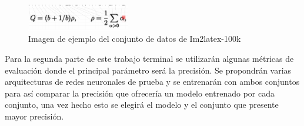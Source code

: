 \begin{figure}[h]
	\centering
	\includegraphics[width=0.4\textwidth]{capitulo5/dataset/Dengetal.png}
	\caption{Imagen de ejemplo del conjunto de datos de Im2latex-100k}
	\label{fig:deng}
\end{figure}

Para la segunda parte de este trabajo terminal se utilizarán algunas métricas de evaluación donde el principal parámetro será la precisión. Se propondrán varias arquitecturas de redes neuronales de prueba y se entrenarán con ambos conjuntos para así comparar la precisión que ofrecería un modelo entrenado por cada conjunto, una vez hecho esto se elegirá el modelo y el conjunto que presente mayor precisión.  